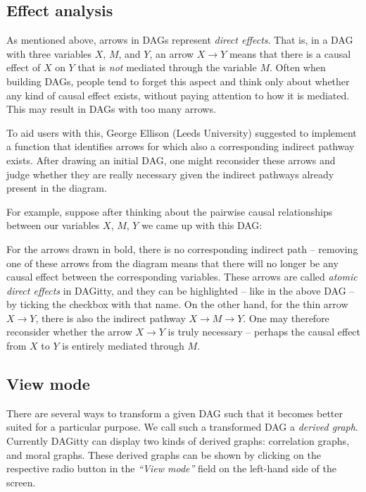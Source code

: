 \documentclass[a4paper]{article} %
\newcommand{\pp}{DAGitty\xspace}
\newcommand{\action}[1]{\emph{``#1''}}
\begin{document}
\subsection{Effect analysis}

As mentioned above, arrows in DAGs represent \emph{direct effects}. That is, in a DAG
with three variables $X$, $M$, and $Y$, an arrow $X \to Y$ means that there is a causal
effect of $X$ on $Y$ that is \emph{not} mediated through the variable $M$. 
Often when building DAGs, people tend to forget this aspect and think only about whether
any kind of causal effect exists, without paying attention to how it is mediated. This 
may result in DAGs with too many arrows. 

To aid users with this, George Ellison (Leeds University) suggested to implement a 
function that identifies arrows for which also a corresponding indirect pathway exists. 
After drawing an initial DAG, one might reconsider these arrows and judge whether they
are really necessary given the indirect pathways already present in the diagram.

For example, suppose after thinking about the pairwise causal relationships between
our variables $X$, $M$, $Y$ we came up with this DAG:


For the arrows drawn in bold, there is no corresponding indirect path -- removing
one of these arrows from the diagram means that there will no longer be any causal 
effect between the corresponding variables. These arrows are called \emph{atomic direct
effects} in \pp, and they can be highlighted -- like in the above DAG -- by ticking
the checkbox with that name. 
On the other hand, for the thin arrow 
$X \to Y$, there is also the indirect pathway $X \to M \to Y$. One may therefore reconsider
whether the arrow $X \to Y$ is truly necessary -- 
perhaps the causal effect from $X$ to $Y$ is entirely mediated through $M$.

\subsection{View mode}

There are several ways to transform a given DAG such that it becomes better suited for 
a particular purpose. We call such a transformed DAG a \emph{derived graph}. Currently
\pp can display two kinds of derived graphs: correlation graphs, and moral graphs.
These derived graphs can be shown by clicking on the respective radio button in the
\action{View mode} field on the left-hand side of the screen. 
\end{document}
